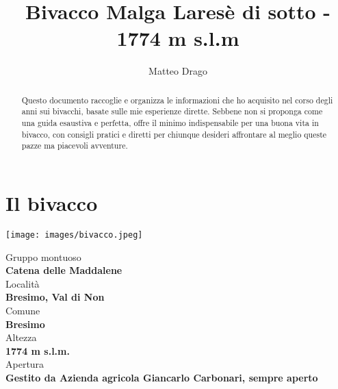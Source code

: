 \documentclass{article}
\title{\textbf{Bivacco Malga Laresè di sotto - 1774 m s.l.m}}
\author{Matteo Drago}
\begin{document}
\maketitle
\thispagestyle{fancy} %

\begin{abstract}
Questo documento raccoglie e organizza le informazioni che ho acquisito nel corso degli anni sui bivacchi, basate sulle mie esperienze dirette. Sebbene non si proponga come una guida esaustiva e perfetta, offre il minimo indispensabile per una buona vita in bivacco, con consigli pratici e diretti per chiunque desideri affrontare al meglio queste pazze ma piacevoli avventure.
\end{abstract}

\section{Il bivacco}

\noindent
\begin{minipage}[t]{0.45\textwidth}
  \vspace{0pt} %
  \texttt{[image: images/bivacco.jpeg]}
\end{minipage}%
\hfill
\begin{minipage}[t]{0.5\textwidth}
  \vspace{0pt} %
  
  Gruppo montuoso\\
  \textbf{\large Catena delle Maddalene}
  \\[1em] %
  Località\\
  \textbf{\large Bresimo, Val di Non}
  \\[1em] %
  Comune\\  
  \textbf{\large Bresimo}
  \\[1em] %
  Altezza\\  
  \textbf{\large 1774 m s.l.m.}
  \\[1em] %
  Apertura\\  
  \textbf{\large Gestito da Azienda agricola Giancarlo Carbonari, sempre aperto}

\end{minipage}
\end{document}
